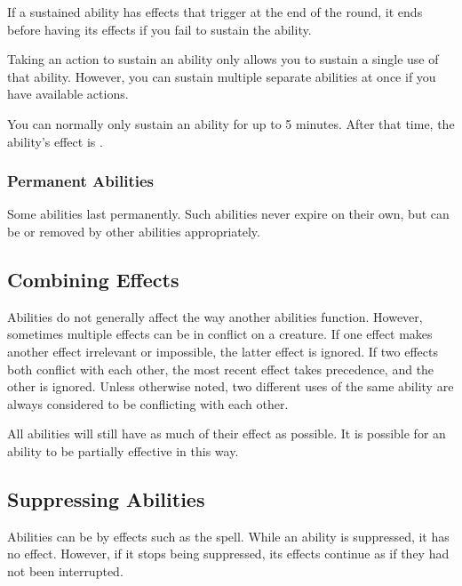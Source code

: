            If a sustained ability has effects that trigger at the end of the round, it ends before having its effects if you fail to sustain the ability.

            Taking an action to sustain an ability only allows you to sustain a single use of that ability.
            However, you can sustain multiple separate abilities at once if you have available actions.

            You can normally only sustain an ability for up to 5 minutes.
            After that time, the ability's effect is .

        \subsubsection{Permanent Abilities}
            Some abilities last permanently.
            Such abilities never expire on their own, but can be  or removed by other abilities appropriately.

    \subsection{Combining Effects}
        Abilities do not generally affect the way another abilities function.
        However, sometimes multiple effects can be in conflict on a creature.
        If one effect makes another effect irrelevant or impossible, the latter effect is ignored.
        If two effects both conflict with each other, the most recent effect takes precedence, and the other is ignored.
        Unless otherwise noted, two different uses of the same ability are always considered to be conflicting with each other.

        All abilities will still have as much of their effect as possible.
        It is possible for an ability to be partially effective in this way.

    \subsection{Suppressing Abilities}\label{Suppressing Abilities}
        Abilities can be  by effects such as the  spell.
        While an ability is suppressed, it has no effect.
        However, if it stops being suppressed, its effects continue as if they had not been interrupted.

